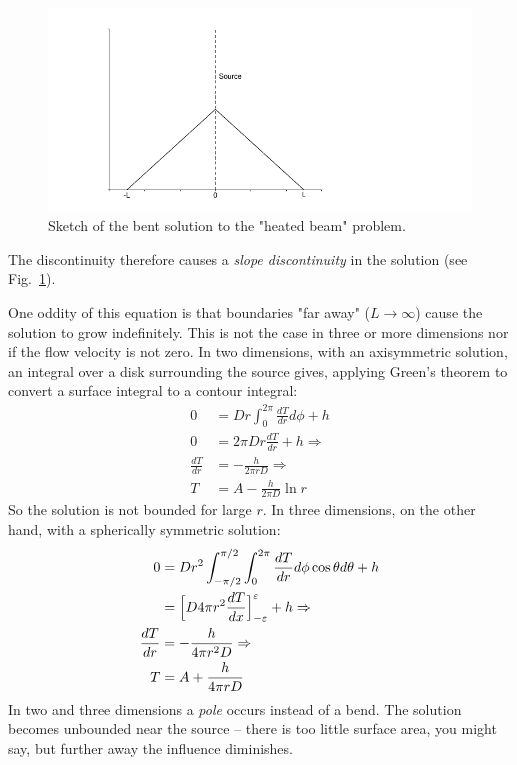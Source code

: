 \documentclass[onecolumn]{article}
\begin{document}
\begin{figure}
\begin{center}
\includegraphics{bend.pdf}
\caption{Sketch of the bent solution to the "heated beam" problem.}
\label{figureBend}
\end{center}
\end{figure}

The discontinuity therefore causes a \emph{slope discontinuity} in the solution (see Fig.\ \ref{figureBend}).

One oddity of this equation is that boundaries "far away" ($L \rightarrow \infty$) cause the solution to grow indefinitely.
This is not the case in three or more dimensions nor if the flow velocity is not zero. In two
dimensions, with an axisymmetric solution, an integral over a disk surrounding the source gives,
applying Green's theorem to convert a surface integral to a contour integral:
%
\begin{align}
          0 &= D r \int_{0}^{2\pi} \frac{d T}{d r} d\phi + h \\
\nonumber 0 &= 2 \pi D r \frac{d T}{d r} + h \Rightarrow \\
\nonumber \frac{d T}{d r} &= -\frac{h}{2 \pi r D} \Rightarrow \\
\nonumber T &= A - \frac{h}{2 \pi D} \ln r
\end{align}
\noindent So the solution is not bounded for large $r$. In three dimensions, on the other hand,
with a spherically symmetric solution:
%
\begin{align}
          0 & =
              D r^2 \int_{-\pi/2}^{\pi/2} \int_{0}^{2\pi} \frac{d T}{d r} d\phi \cos \theta d\theta + h \\
\nonumber   & =
              \Bigl [D 4 \pi r^2 \frac{d T}{d x} \Bigr ]_{-\varepsilon}^{\varepsilon} + h \Rightarrow \\
\nonumber   \frac{dT}{dr} & =  -\frac{h}{4 \pi r^2 D} \Rightarrow \\
            T &=  A + \frac{h}{4 \pi r D}
\end{align}
In two and three dimensions a \emph{pole} occurs instead of a bend. The solution becomes unbounded near the
source -- there is too little surface area, you might say, but further away the influence diminishes.
\end{document}
